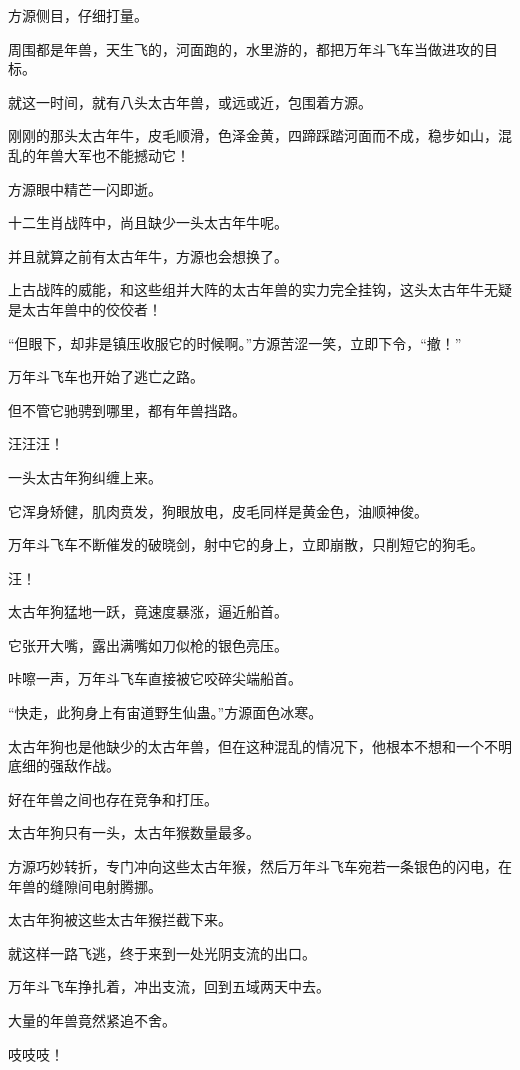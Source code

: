 \begin{this_body}
方源侧目，仔细打量。

周围都是年兽，天生飞的，河面跑的，水里游的，都把万年斗飞车当做进攻的目标。

就这一时间，就有八头太古年兽，或远或近，包围着方源。

刚刚的那头太古年牛，皮毛顺滑，色泽金黄，四蹄踩踏河面而不成，稳步如山，混乱的年兽大军也不能撼动它！

方源眼中精芒一闪即逝。

十二生肖战阵中，尚且缺少一头太古年牛呢。

并且就算之前有太古年牛，方源也会想换了。

上古战阵的威能，和这些组并大阵的太古年兽的实力完全挂钩，这头太古年牛无疑是太古年兽中的佼佼者！

“但眼下，却非是镇压收服它的时候啊。”方源苦涩一笑，立即下令，“撤！”

万年斗飞车也开始了逃亡之路。

但不管它驰骋到哪里，都有年兽挡路。

汪汪汪！

一头太古年狗纠缠上来。

它浑身矫健，肌肉贲发，狗眼放电，皮毛同样是黄金色，油顺神俊。

万年斗飞车不断催发的破晓剑，射中它的身上，立即崩散，只削短它的狗毛。

汪！

太古年狗猛地一跃，竟速度暴涨，逼近船首。

它张开大嘴，露出满嘴如刀似枪的银色亮压。

咔嚓一声，万年斗飞车直接被它咬碎尖端船首。

“快走，此狗身上有宙道野生仙蛊。”方源面色冰寒。

太古年狗也是他缺少的太古年兽，但在这种混乱的情况下，他根本不想和一个不明底细的强敌作战。

好在年兽之间也存在竞争和打压。

太古年狗只有一头，太古年猴数量最多。

方源巧妙转折，专门冲向这些太古年猴，然后万年斗飞车宛若一条银色的闪电，在年兽的缝隙间电射腾挪。

太古年狗被这些太古年猴拦截下来。

就这样一路飞逃，终于来到一处光阴支流的出口。

万年斗飞车挣扎着，冲出支流，回到五域两天中去。

大量的年兽竟然紧追不舍。

吱吱吱！


\end{this_body}
